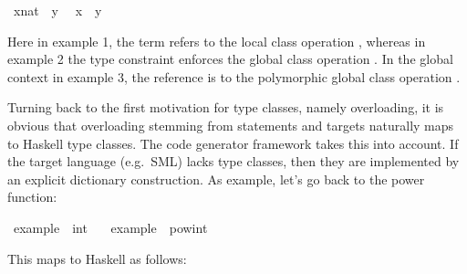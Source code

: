 \begin{isabellebody}
\isanewline
{}\isamarkupfalse%
\ {\isachardoublequoteopen}{\isacharparenleft}x{\isasymColon}nat{\isacharparenright}\ {\isasymotimes}\ y{\isachardoublequoteclose}\ %
\isanewline
\isanewline
{}\isamarkupfalse%
\isanewline
\isanewline
{}\isamarkupfalse%
\ {\isachardoublequoteopen}x\ {\isasymotimes}\ y{\isachardoublequoteclose}\ %
%
\endisatagquote
{\isafoldquote}%
%
\isadelimquote
%
\endisadelimquote
%
\begin{isamarkuptext}%
\noindent Here in example 1, the term refers to the local class
  operation , whereas in example 2 the type
  constraint enforces the global class operation .
  In the global context in example 3, the reference is to the
  polymorphic global class operation .%
\end{isamarkuptext}%
\isamarkuptrue%
%
\isamarkuptrue%
%
\isamarkuptrue%
%
\begin{isamarkuptext}%
Turning back to the first motivation for type classes, namely
  overloading, it is obvious that overloading stemming from \hyperlink{command.class}{\mbox{}} statements and \hyperlink{command.instantiation}{\mbox{}} targets naturally
  maps to Haskell type classes.  The code generator framework
  \cite{isabelle-codegen} takes this into account.  If the target
  language (e.g.~SML) lacks type classes, then they are implemented by
  an explicit dictionary construction.  As example, let's go back to
  the power function:%
\end{isamarkuptext}%
\isamarkuptrue%
%
\isadelimquote
%
\endisadelimquote
%
\isatagquote
{}\isamarkupfalse%
\ example\ {\isacharcolon}{\isacharcolon}\ int\ \isanewline
\ \ {\isachardoublequoteopen}example\ {\isacharequal}\ pow{\isacharunderscore}int\ {}{}\ {\isacharparenleft}{\isacharminus}{}{\isacharparenright}{\isachardoublequoteclose}%
\endisatagquote
{\isafoldquote}%
%
\isadelimquote
%
\endisadelimquote
%
\begin{isamarkuptext}%
\noindent This maps to Haskell as follows:%
\end{isamarkuptext}%

\end{isabellebody}
